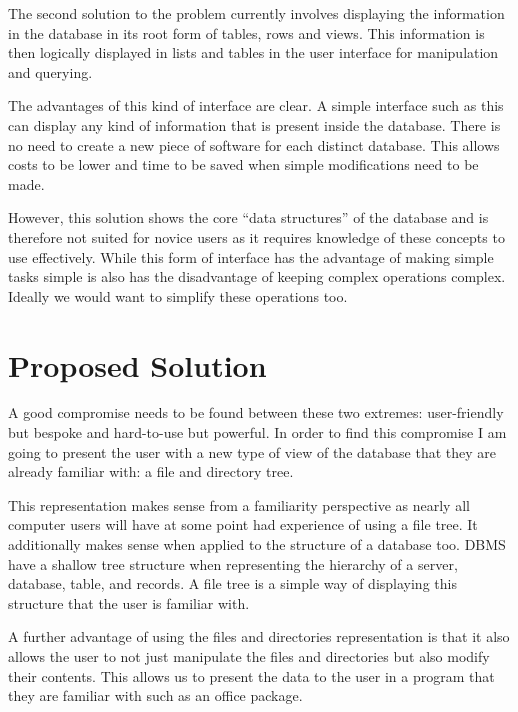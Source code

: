 The second solution to the problem currently involves displaying the information in the database in its root form of tables, rows and views. This information is then logically displayed in lists and tables in the user interface for manipulation and querying.

The advantages of this kind of interface are clear. A simple interface such as this can display any kind of information that is present inside the database. There is no need to create a new piece of software for each distinct database. This allows costs to be lower and time to be saved when simple modifications need to be made.

However, this solution shows the core ``data structures'' of the database and is therefore not suited for novice users as it requires knowledge of these concepts to use effectively. While this form of interface has the advantage of making simple tasks simple is also has the disadvantage of keeping complex operations complex. Ideally we would want to simplify these operations too.

\section{Proposed Solution}

A good compromise needs to be found between these two extremes: user-friendly but bespoke and hard-to-use but powerful. In order to find this compromise I am going to present the user with a new type of view of the database that they are already familiar with: a file and directory tree.

This representation makes sense from a familiarity perspective as nearly all computer users will have at some point had experience of using a file tree. It additionally makes sense when applied to the structure of a database too. \acf{DBMS} have a shallow tree structure when representing the hierarchy of a server, database, table, and records. A file tree is a simple way of displaying this structure that the user is familiar with.

 A further advantage of using the files and directories representation is that it also allows the user to not just manipulate the files and directories but also modify their contents. This allows us to present the data to the user in a program that they are familiar with such as an office package.